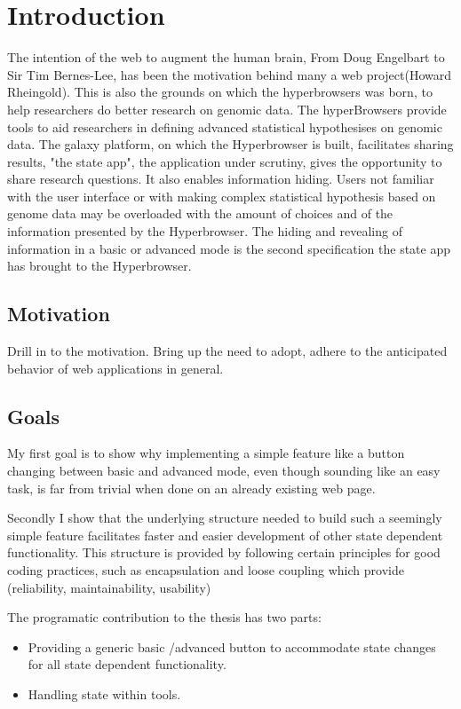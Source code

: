 \documentclass[english]{ifimaster}
\begin{document}
\chapter{Introduction}
The intention of the web to augment the human brain, From Doug Engelbart to Sir Tim Bernes-Lee, has been the motivation behind many a web project(Howard Rheingold). This is also the grounds on which the hyperbrowsers was born, to help researchers do better research on genomic data. The hyperBrowsers provide tools to aid researchers in defining advanced statistical hypothesises on genomic data. The galaxy platform, on which the Hyperbrowser is built, facilitates sharing results, "the state app", the application under scrutiny, gives the opportunity to share research questions. It also enables information hiding. Users not familiar with the user interface or with making complex statistical hypothesis based on genome data may be overloaded with the amount of choices and of the information presented by the Hyperbrowser. The hiding and revealing of information in a basic or advanced mode is the second specification the state app has brought to the Hyperbrowser.

\section{Motivation}%
Drill in to the motivation. Bring up the need to adopt, adhere to the anticipated behavior of web applications in general. 


\section{Goals}
My first goal is to show why implementing a simple feature like a button changing between basic and advanced mode, even though sounding like an easy task, is far from trivial when done on an already existing web page. 

Secondly I show that the underlying structure needed to build such a seemingly simple feature facilitates faster and easier development of other state dependent functionality. This structure is provided by following certain principles for good coding practices, such as encapsulation and loose coupling which provide (reliability, maintainability, usability)

The programatic contribution to the thesis has two parts:
\begin{itemize}
  \item Providing a generic basic /advanced button to accommodate state changes for all state dependent functionality.
  \item Handling state within tools. 
\end{itemize}
\end{document}
